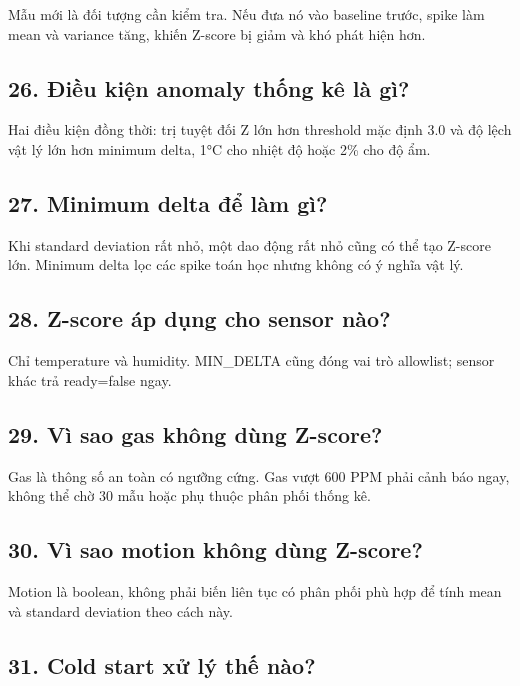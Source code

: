 \documentclass[11pt,oneside,openany]{book}
\renewcommand{\texttt}[1]{{\ttfamily\small #1}}
\begin{document}
Mẫu mới là đối tượng cần kiểm tra. Nếu đưa nó vào baseline trước, spike
làm mean và variance tăng, khiến Z-score bị giảm và khó phát hiện hơn.

\subsection{26. Điều kiện anomaly thống kê là
gì?}\label{26-ux111iux1ec1u-kiux1ec7n-anomaly-thux1ed1ng-kuxea-luxe0-guxec}

Hai điều kiện đồng thời: trị tuyệt đối Z lớn hơn threshold mặc định 3.0
và độ lệch vật lý lớn hơn minimum delta, 1°C cho nhiệt độ hoặc 2\% cho
độ ẩm.

\subsection{27. Minimum delta để làm
gì?}\label{27-minimum-delta-ux111ux1ec3-luxe0m-guxec}

Khi standard deviation rất nhỏ, một dao động rất nhỏ cũng có thể tạo
Z-score lớn. Minimum delta lọc các spike toán học nhưng không có ý nghĩa
vật lý.

\subsection{28. Z-score áp dụng cho sensor
nào?}\label{28-z-score-uxe1p-dux1ee5ng-cho-sensor-nuxe0o}

Chỉ temperature và humidity. \texttt{MIN\_DELTA} cũng đóng vai trò
allowlist; sensor khác trả \texttt{ready=false} ngay.

\subsection{29. Vì sao gas không dùng
Z-score?}\label{29-vuxec-sao-gas-khuxf4ng-duxf9ng-z-score}

Gas là thông số an toàn có ngưỡng cứng. Gas vượt 600 PPM phải cảnh báo
ngay, không thể chờ 30 mẫu hoặc phụ thuộc phân phối thống kê.

\subsection{30. Vì sao motion không dùng
Z-score?}\label{30-vuxec-sao-motion-khuxf4ng-duxf9ng-z-score}

Motion là boolean, không phải biến liên tục có phân phối phù hợp để tính
mean và standard deviation theo cách này.

\subsection{31. Cold start xử lý thế
nào?}\label{31-cold-start-xux1eed-luxfd-thux1ebf-nuxe0o}
\end{document}
